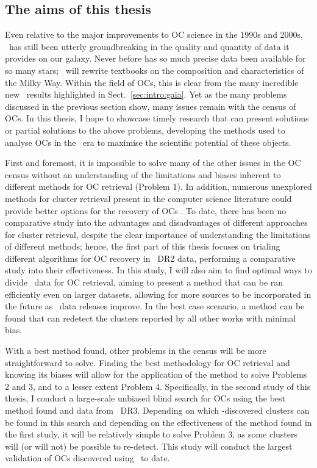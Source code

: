 \subsection{The aims of this thesis}
\label{sec:intro:issues:aims}

Even relative to the major improvements to OC science in the 1990s and 2000s, \gaia\ has still been utterly groundbreaking in the quality and quantity of data it provides on our galaxy. Never before has so much precise data been available for so many stars; \gaia\ will rewrite textbooks on the composition and characteristics of the Milky Way. Within the field of OCs, this is clear from the many incredible new \gaia\ results highlighted in Sect.~\ref{sec:intro:gaia}. Yet as the many problems discussed in the previous section show, many issues remain with the census of OCs. In this thesis, I hope to showcase timely research that can present solutions or partial solutions to the above problems, developing the methods used to analyse OCs in the \gaia\ era to maximise the scientific potential of these objects.

First and foremost, it is impossible to solve many of the other issues in the OC census without an understanding of the limitations and biases inherent to different methods for OC retrieval (Problem 1). In addition, numerous unexplored methods for cluster retrieval present in the computer science literature could provide better options for the recovery of OCs \citep{xu_comprehensive_2015}. To date, there has been no comparative study into the advantages and disadvantages of different approaches for cluster retrieval, despite the clear importance of understanding the limitations of different methods; hence, the first part of this thesis focuses on trialing different algorithms for OC recovery in \gaia\ DR2 data, performing a comparative study into their effectiveness. In this study, I will also aim to find optimal ways to divide \gaia\ data for OC retrieval, aiming to present a method that can be ran efficiently even on larger datasets, allowing for more sources to be incorporated in the future as \gaia\ data releases improve. In the best case scenario, a method can be found that can redetect the clusters reported by all other works with minimal bias.

With a best method found, other problems in the census will be more straightforward to solve. Finding the best methodology for OC retrieval and knowing its biases will allow for the application of the method to solve Problems 2 and 3, and to a lesser extent Problem 4. Specifically, in the second study of this thesis, I conduct a large-scale unbiased blind search for OCs using the best method found and data from \gaia\ DR3. Depending on which \gaia-discovered clusters can be found in this search and depending on the effectiveness of the method found in the first study, it will be relatively simple to solve Problem 3, as some clusters will (or will not) be possible to re-detect. This study will conduct the largest validation of OCs discovered using \gaia\ to date.

